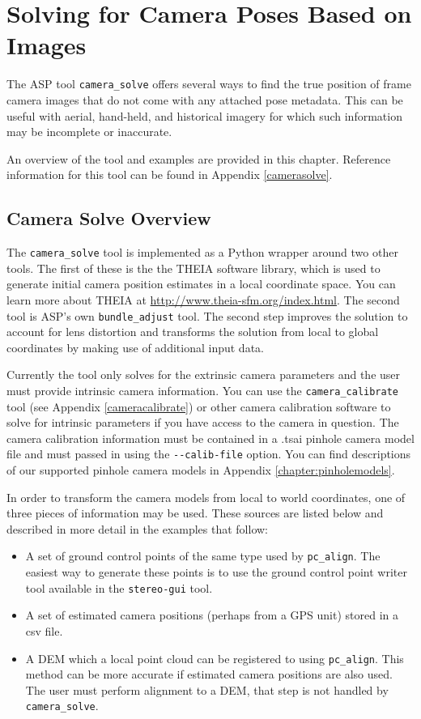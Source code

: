 \chapter{Solving for Camera Poses Based on Images}
\label{ch:sfm}

The ASP tool \texttt{camera\_solve} offers several ways
to find the true position of frame camera images that do
not come with any attached pose metadata. This can be useful with
aerial, hand-held, and historical imagery for which such information
may be incomplete or inaccurate.

An overview of the tool and examples are provided in this chapter.
Reference information for this tool can be found in Appendix
\ref{camerasolve}.

\section{Camera Solve Overview}

The \texttt{camera\_solve} tool is implemented as a Python wrapper around
two other tools.  The first of these is the the THEIA software library,
which is used to generate initial camera position estimates in a local
coordinate space.  You can learn more about THEIA at
\url{http://www.theia-sfm.org/index.html}.  The second tool is ASP's
own \texttt{bundle\_adjust} tool.  The second step improves the solution
to account for lens distortion and transforms the solution from local
to global coordinates by making use of additional input data.

Currently the tool only solves for the extrinsic camera parameters
and the user must provide intrinsic camera information.
You can use the \texttt{camera\_calibrate}
tool (see Appendix \ref{cameracalibrate}) or other camera calibration software
to solve for intrinsic parameters if you have access to the camera in question.
The camera calibration information must be contained in a
.tsai pinhole camera model file and must passed in using the
\texttt{-\/-calib-file} option.  You can find descriptions of
our supported pinhole camera models in Appendix \ref{chapter:pinholemodels}.

In order to transform the camera models from local to world coordinates,
one of three pieces of information may be used.  These sources are listed
below and described in more detail in the examples that follow:
\begin{itemize}{}
\item A set of ground control points of the same type used by \texttt{pc\_align}.
The easiest way to generate these points is to use the ground control point
writer tool available in the \texttt{stereo-gui} tool.
\item A set of estimated camera positions (perhaps from a GPS unit) stored in
a csv file.
\item A DEM which a local point cloud can be registered to using \texttt{pc\_align}.
This method can be more accurate if estimated camera positions are also used.  The user
must perform alignment to a DEM, that step is not handled by \texttt{camera\_solve}.
\end{itemize}{}


